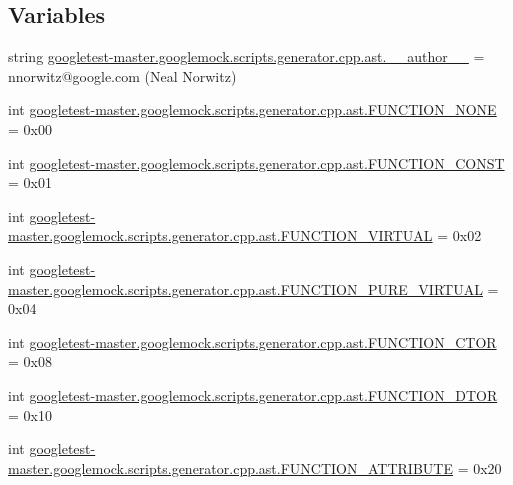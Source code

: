 \subsection*{Variables}
\begin{DoxyCompactItemize}
\item 
string \mbox{\hyperlink{namespacegoogletest-master_1_1googlemock_1_1scripts_1_1generator_1_1cpp_1_1ast_a532b223f9c9c7c893c7764ad72e3327f}{googletest-\/master.\+googlemock.\+scripts.\+generator.\+cpp.\+ast.\+\_\+\+\_\+author\+\_\+\+\_\+}} = \textquotesingle{}nnorwitz@google.\+com (Neal Norwitz)\textquotesingle{}
\item 
int \mbox{\hyperlink{namespacegoogletest-master_1_1googlemock_1_1scripts_1_1generator_1_1cpp_1_1ast_a453fc301daaf953122e2e144ac355f13}{googletest-\/master.\+googlemock.\+scripts.\+generator.\+cpp.\+ast.\+F\+U\+N\+C\+T\+I\+O\+N\+\_\+\+N\+O\+NE}} = 0x00
\item 
int \mbox{\hyperlink{namespacegoogletest-master_1_1googlemock_1_1scripts_1_1generator_1_1cpp_1_1ast_aa0aef84d5d5ae539701fafcae6ef658a}{googletest-\/master.\+googlemock.\+scripts.\+generator.\+cpp.\+ast.\+F\+U\+N\+C\+T\+I\+O\+N\+\_\+\+C\+O\+N\+ST}} = 0x01
\item 
int \mbox{\hyperlink{namespacegoogletest-master_1_1googlemock_1_1scripts_1_1generator_1_1cpp_1_1ast_ab5c044e6c3241e262ecb6881ae32fccd}{googletest-\/master.\+googlemock.\+scripts.\+generator.\+cpp.\+ast.\+F\+U\+N\+C\+T\+I\+O\+N\+\_\+\+V\+I\+R\+T\+U\+AL}} = 0x02
\item 
int \mbox{\hyperlink{namespacegoogletest-master_1_1googlemock_1_1scripts_1_1generator_1_1cpp_1_1ast_a0269029d542580eb3754e403705aaaea}{googletest-\/master.\+googlemock.\+scripts.\+generator.\+cpp.\+ast.\+F\+U\+N\+C\+T\+I\+O\+N\+\_\+\+P\+U\+R\+E\+\_\+\+V\+I\+R\+T\+U\+AL}} = 0x04
\item 
int \mbox{\hyperlink{namespacegoogletest-master_1_1googlemock_1_1scripts_1_1generator_1_1cpp_1_1ast_aedd420932bd6d3f39869ba70aabfdf74}{googletest-\/master.\+googlemock.\+scripts.\+generator.\+cpp.\+ast.\+F\+U\+N\+C\+T\+I\+O\+N\+\_\+\+C\+T\+OR}} = 0x08
\item 
int \mbox{\hyperlink{namespacegoogletest-master_1_1googlemock_1_1scripts_1_1generator_1_1cpp_1_1ast_aed8775ec393bbaaecf30b84853f61f56}{googletest-\/master.\+googlemock.\+scripts.\+generator.\+cpp.\+ast.\+F\+U\+N\+C\+T\+I\+O\+N\+\_\+\+D\+T\+OR}} = 0x10
\item 
int \mbox{\hyperlink{namespacegoogletest-master_1_1googlemock_1_1scripts_1_1generator_1_1cpp_1_1ast_aafd16d2b1ef8cd2f49938b6cc7be9f06}{googletest-\/master.\+googlemock.\+scripts.\+generator.\+cpp.\+ast.\+F\+U\+N\+C\+T\+I\+O\+N\+\_\+\+A\+T\+T\+R\+I\+B\+U\+TE}} = 0x20

\end{DoxyCompactItemize}

